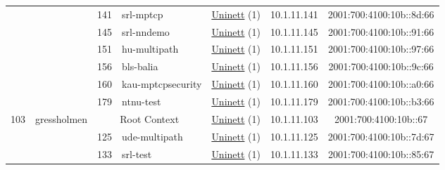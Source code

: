 \begin{small}
\begin{center}
\begin{longtable}{|c|c|c|c|c|c|c|c|}
  &  & \tiny{141} & \multicolumn{1}{|l|}{\tiny{srl-mptcp}} & \multicolumn{2}{|c|}{\tiny{\href{https://www.uninett.no}{Uninett} (1)}} & \tiny{10.1.11.141} & \tiny{2001:700:4100:10b::8d:66} \\* \cline{3-3}\cline{4-4}\cline{5-5}\cline{6-6}\cline{7-7}\cline{8-8}
  &  & \tiny{145} & \multicolumn{1}{|l|}{\tiny{srl-nndemo}} & \multicolumn{2}{|c|}{\tiny{\href{https://www.uninett.no}{Uninett} (1)}} & \tiny{10.1.11.145} & \tiny{2001:700:4100:10b::91:66} \\* \cline{3-3}\cline{4-4}\cline{5-5}\cline{6-6}\cline{7-7}\cline{8-8}
  &  & \tiny{151} & \multicolumn{1}{|l|}{\tiny{hu-multipath}} & \multicolumn{2}{|c|}{\tiny{\href{https://www.uninett.no}{Uninett} (1)}} & \tiny{10.1.11.151} & \tiny{2001:700:4100:10b::97:66} \\* \cline{3-3}\cline{4-4}\cline{5-5}\cline{6-6}\cline{7-7}\cline{8-8}
  &  & \tiny{156} & \multicolumn{1}{|l|}{\tiny{bls-balia}} & \multicolumn{2}{|c|}{\tiny{\href{https://www.uninett.no}{Uninett} (1)}} & \tiny{10.1.11.156} & \tiny{2001:700:4100:10b::9c:66} \\* \cline{3-3}\cline{4-4}\cline{5-5}\cline{6-6}\cline{7-7}\cline{8-8}
  &  & \tiny{160} & \multicolumn{1}{|l|}{\tiny{kau-mptcpsecurity}} & \multicolumn{2}{|c|}{\tiny{\href{https://www.uninett.no}{Uninett} (1)}} & \tiny{10.1.11.160} & \tiny{2001:700:4100:10b::a0:66} \\* \cline{3-3}\cline{4-4}\cline{5-5}\cline{6-6}\cline{7-7}\cline{8-8}
  &  & \tiny{179} & \multicolumn{1}{|l|}{\tiny{ntnu-test}} & \multicolumn{2}{|c|}{\tiny{\href{https://www.uninett.no}{Uninett} (1)}} & \tiny{10.1.11.179} & \tiny{2001:700:4100:10b::b3:66} \\ \hline
 \multirow{9}{*}{\tiny{103}} & \multicolumn{1}{|l|}{\multirow{9}{*}{\tiny{gressholmen}}} & \multicolumn{2}{|c|}{\tiny{Root Context}} & \multicolumn{2}{|c|}{\tiny{\href{https://www.uninett.no}{Uninett} (1)}} & \tiny{10.1.11.103} & \tiny{2001:700:4100:10b::67} \\* \cline{3-3}\cline{4-4}\cline{5-5}\cline{6-6}\cline{7-7}\cline{8-8}
  &  & \tiny{125} & \multicolumn{1}{|l|}{\tiny{ude-multipath}} & \multicolumn{2}{|c|}{\tiny{\href{https://www.uninett.no}{Uninett} (1)}} & \tiny{10.1.11.125} & \tiny{2001:700:4100:10b::7d:67} \\* \cline{3-3}\cline{4-4}\cline{5-5}\cline{6-6}\cline{7-7}\cline{8-8}
  &  & \tiny{133} & \multicolumn{1}{|l|}{\tiny{srl-test}} & \multicolumn{2}{|c|}{\tiny{\href{https://www.uninett.no}{Uninett} (1)}} & \tiny{10.1.11.133} & \tiny{2001:700:4100:10b::85:67} \\* \cline{3-3}\cline{4-4}\cline{5-5}\cline{6-6}\cline{7-7}\cline{8-8}

\end{longtable}
\end{center}
\end{small}
